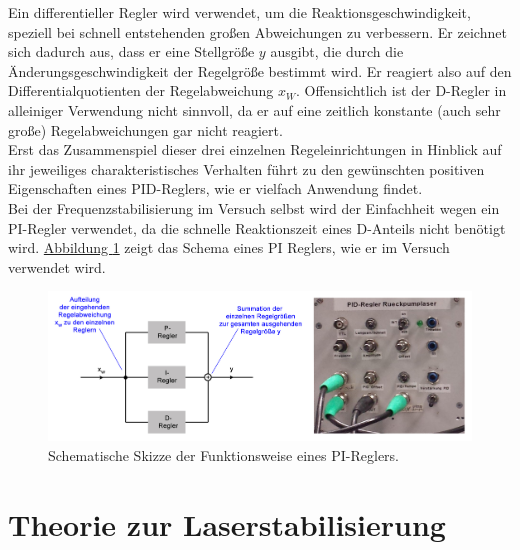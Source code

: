 \documentclass[
class=book,
accentcolor=1b,
custommargins=geometry,
fontsize=11pt,
thesis={type=Versuchsanleitung},
ruledheaders=all,
headline=false,
instbox=false,
marginpar=false,
title=small,
ignore-missing-data=true,
twoside=false,
logofile=apqdesign/tuda_logo.pdf,
pdfa=false %
]{apqpub}
\begin{document}
			Ein differentieller Regler wird verwendet, um die Reaktionsgeschwindigkeit, speziell bei schnell entstehenden großen Abweichungen zu verbessern. 
			Er zeichnet sich dadurch aus, dass er eine Stellgröße $y$ ausgibt, die durch die Änderungsgeschwindigkeit der Regelgröße bestimmt wird. 
			Er reagiert also auf den Differentialquotienten der Regelabweichung $x_W$. 
			Offensichtlich ist der D-Regler in alleiniger Verwendung nicht sinnvoll, da er auf eine zeitlich konstante (auch sehr große) Regelabweichungen gar nicht reagiert.\\
			Erst das Zusammenspiel dieser drei einzelnen Regeleinrichtungen in Hinblick auf ihr jeweiliges charakteristisches Verhalten führt zu den gewünschten positiven Eigenschaften eines PID-Reglers, wie er vielfach Anwendung findet. \cite{PID}\\
			Bei der Frequenzstabilisierung im Versuch selbst wird der Einfachheit wegen ein PI-Regler verwendet, da die schnelle Reaktionszeit eines D-Anteils nicht benötigt wird. 
			\hyperref[fig:PID]{Abbildung \ref{fig:PID}} zeigt das Schema eines PI Reglers, wie er im Versuch verwendet wird.
			\begin{figure}[htb!]
				\centering
				\includegraphics[width=\textwidth]{graphics/PID.jpg}
				\caption{Schematische Skizze der Funktionsweise eines PI-Reglers.}
				\label{fig:PID}
			\end{figure}
			
			\chapter{Theorie zur Laserstabilisierung}
			
\end{document}
